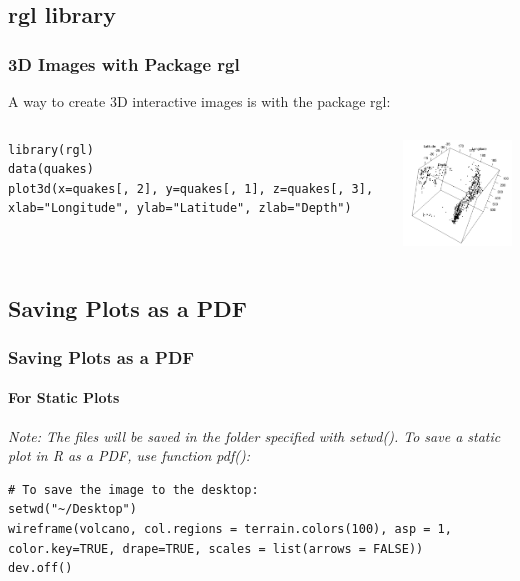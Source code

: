 \subsection{\ttfamily rgl \normalfont library} 
\begin{frame}[fragile]
\frametitle{3D Images with Package \ttfamily rgl \normalfont}

A way to create 3D interactive images is with the package \ttfamily rgl: \normalfont 

    \begin{columns}
\begin{lstlisting}
library(rgl)
data(quakes)
plot3d(x=quakes[, 2], y=quakes[, 1], z=quakes[, 3], xlab="Longitude", ylab="Latitude", zlab="Depth")
\end{lstlisting}

       \begin{center}
\includegraphics[width = 55mm]{images/Fiji_RGL}
\end{center}
\end{columns}
\end{frame}

\subsection{Saving Plots as a PDF} 
\begin{frame}[fragile]
\frametitle{Saving Plots as a PDF}
\framesubtitle{For Static Plots}

\itshape Note: \normalfont The files will be saved in the folder specified with \ttfamily setwd(). \normalfont
To save a static plot in \ttfamily R \normalfont as a PDF, use function \ttfamily pdf(): \normalfont

\begin{lstlisting}
# To save the image to the desktop:
setwd("~/Desktop")
wireframe(volcano, col.regions = terrain.colors(100), asp = 1, color.key=TRUE, drape=TRUE, scales = list(arrows = FALSE))
dev.off()
\end{lstlisting}

\end{frame}

